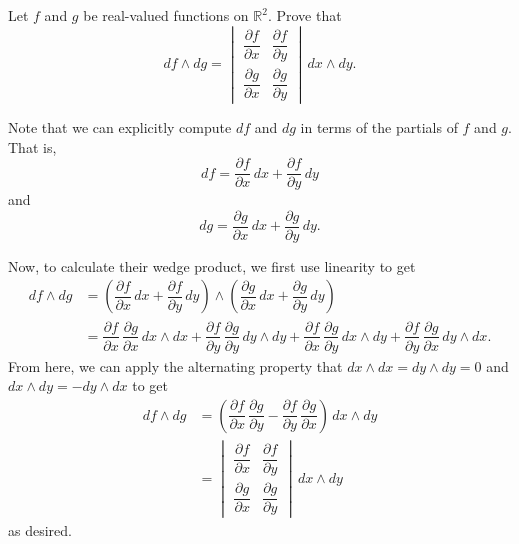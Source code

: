 \documentclass[12 pt, letterpaper]{hmcpset}
\begin{document}
\pagebreak

\begin{problem}[Problem 5]
	Let $f$ and $g$ be real-valued functions on $\mathbb R^2$. Prove that
	\[
		df \wedge dg = \begin{vmatrix}
			\dfrac{\partial f}{\partial x} & \dfrac{\partial f}{\partial y} \\
			\dfrac{\partial g}{\partial x} & \dfrac{\partial g}{\partial y}
		\end{vmatrix} \, dx \wedge dy.
	\]
\end{problem}

\begin{solution}
	Note that we can explicitly compute $df$ and $dg$ in terms of the partials of $f$ and $g$. That is, 
	\[
		df = \dfrac{\partial f}{\partial x} \, dx + \dfrac{\partial f}{\partial y} \, dy
	\]
	and
	\[
		dg = \dfrac{\partial g}{\partial x} \, dx + \dfrac{\partial g}{\partial y} \, dy.
	\]

	Now, to calculate their wedge product, we first use linearity to get
	\[
		\begin{split}
			df \wedge dg & = \left ( \dfrac{\partial f}{\partial x} \, dx + \dfrac{\partial f}{\partial y} \, dy \right ) \wedge \left ( \dfrac{\partial g}{\partial x} \, dx + \dfrac{\partial g}{\partial y} \, dy \right ) \\
				     & = \dfrac{\partial f}{\partial x} \, \dfrac{\partial g}{\partial x} \, dx \wedge dx + \dfrac{\partial f}{\partial y} \, \dfrac{\partial g}{\partial y} \, dy \wedge dy + \dfrac{\partial f}{\partial x} \, \dfrac{\partial g}{\partial y} \, dx \wedge dy + \dfrac{\partial f}{\partial y} \, \dfrac{\partial g}{\partial x} \, dy \wedge dx.
		\end{split}
	\]
	From here, we can apply the alternating property that $dx \wedge dx = dy \wedge dy = 0$ and $dx \wedge dy = - dy \wedge dx$ to get
	\[
		\begin{split}
			df \wedge dg & = \left ( \dfrac{\partial f}{\partial x} \, \dfrac{\partial g}{\partial y} - \dfrac{\partial f}{\partial y} \, \dfrac{\partial g}{\partial x} \right ) \, dx \wedge dy \\
				     & = \begin{vmatrix}
			\dfrac{\partial f}{\partial x} & \dfrac{\partial f}{\partial y} \\
			\dfrac{\partial g}{\partial x} & \dfrac{\partial g}{\partial y}
		\end{vmatrix} \, dx \wedge dy
		\end{split}
	\]
	as desired.
\end{solution}
\end{document}
